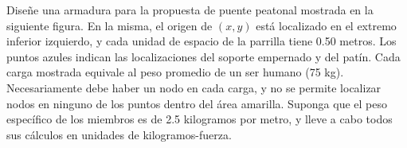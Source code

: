 \documentclass[ a4paper, twoside, 11pt]{article}
\begin{document}
\newpage

\begin{problem}

Dise\~ne una armadura para la propuesta de puente peatonal mostrada en la siguiente figura. En la misma, el origen de $(x,y)$ est\'a localizado en el extremo inferior izquierdo, y cada unidad de espacio de la parrilla tiene 0.50 metros. Los puntos azules indican las localizaciones del soporte empernado y del pat\'in. Cada carga mostrada equivale al peso promedio de un ser humano (75 kg). Necesariamente debe haber un nodo en cada carga, y no se permite localizar nodos en ninguno de los puntos dentro del \'area amarilla. Suponga que el peso espec\'ifico de los miembros es de 2.5 kilogramos por metro, y lleve a cabo todos sus c\'alculos en unidades de kilogramos-fuerza. 
\fullskip

\begin{figure}[htb]
\centering
\def\svgwidth{0.9\columnwidth}

\end{figure}
\halfskip

\end{problem}
\fullskip

%
\end{document}
